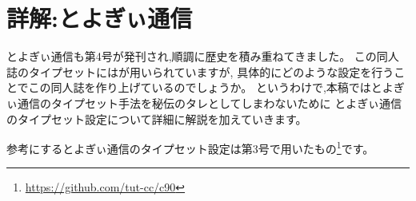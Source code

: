 \newcommand*{\reflisting}[1]{\lstlistingname\ \ref{#1}}
\renewcommand*\descriptionlabel[1]{\normalfont\headfont #1 :\hfil}
\newcommand*{\jyquote}[1]{“#1”}

\chapter{詳解:とよぎぃ通信}

とよぎぃ通信も第4号が発刊され,順調に歴史を積み重ねてきました。
この同人誌のタイプセットには{\pLaTeX}が用いられていますが,
具体的にどのような設定を行うことでこの同人誌を作り上げているのでしょうか。
というわけで,本稿ではとよぎぃ通信のタイプセット手法を秘伝のタレとしてしまわないために
とよぎぃ通信のタイプセット設定について詳細に解説を加えていきます。

参考にするとよぎぃ通信のタイプセット設定は第3号で用いたもの\footnote{\url{https://github.com/tut-cc/c90}}です。

